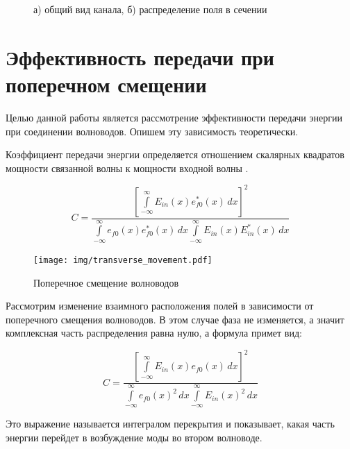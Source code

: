 \begin{figure}[h!]
	\begin{minipage}[h]{0.49\linewidth}
	\end{minipage}
	\hfill
	\begin{minipage}[h]{0.49\linewidth}
	\end{minipage}
	\caption{а) общий вид канала, б) распределение поля в сечении}
	\label{polozok}
\end{figure}

\section{Эффективность передачи при поперечном смещении}

Целью данной работы является рассмотрение эффективности передачи энергии при соединении волноводов. Опишем эту зависимость теоретически.

Коэффициент передачи энергии определяется отношением скалярных квадратов мощности связанной волны к мощности входной волны \cite{lefevre}.

\begin{equation}
	\label{coupling_full}
	C = \frac{\left[\int\limits_{-\infty}^{\infty}E_{in}(x)e_{f0}^*(x) \,dx\right]^2}
	{\int\limits_{-\infty}^{\infty}e_{f0}(x)e_{f0}^*(x) \,dx
	 \int\limits_{-\infty}^{\infty}E_{in}(x)E_{in}^*(x) \,dx}
\end{equation}

\begin{figure}[h!]
	\texttt{[image: img/transverse\_movement.pdf]}
	\caption{Поперечное смещение волноводов}
	\label{transverse_movement}
\end{figure}

Рассмотрим изменение взаимного расположения полей в зависимости от поперечного смещения волноводов. В этом случае фаза не изменяется, а значит комплексная часть распределения равна нулю, а формула примет вид:

\begin{equation}
	\label{coupling}
	C = \frac{\left[\int\limits_{-\infty}^{\infty}E_{in}(x)e_{f0}(x) \,dx\right]^2}
	{\int\limits_{-\infty}^{\infty}e_{f0}(x)^2 \,dx
	 \int\limits_{-\infty}^{\infty}E_{in}(x)^2 \,dx}
\end{equation}

Это выражение называется интегралом перекрытия  и показывает, какая часть энергии перейдет в возбуждение моды во втором волноводе. 

